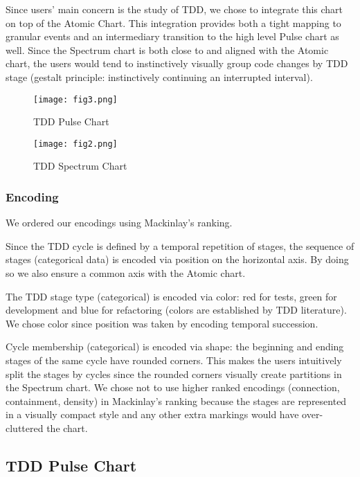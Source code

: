 \documentclass[journal]{vgtc}                %
\begin{document}
Since users' main concern is the study of TDD, we chose to integrate this chart on top of the Atomic Chart.
This integration provides both a tight mapping to granular events and an intermediary transition to the high level Pulse chart as well.
Since the Spectrum chart is both close to and aligned with the Atomic chart, the users would tend to instinctively visually group code changes by TDD stage (gestalt principle: instinctively continuing an interrupted interval).

\begin{figure*}
	\texttt{[image: fig3.png]}
	\caption{TDD Pulse Chart}
	\label{fig:three}
\end{figure*}

\begin{figure*}
	\texttt{[image: fig2.png]}
	\caption{TDD Spectrum Chart}
	\label{fig:two}
\end{figure*}

\subsubsection{Encoding}

We ordered our encodings using Mackinlay's ranking.

Since the TDD cycle is defined by a temporal repetition of stages, the sequence of stages (categorical data) is encoded via position on the horizontal axis.
By doing so we also ensure a common axis with the Atomic chart.

The TDD stage type (categorical) is encoded via color: red for tests, green for development and blue for refactoring (colors are established by TDD literature). We chose color since position was taken by encoding temporal succession.

Cycle membership (categorical) is encoded via shape: the beginning and ending stages of the same cycle have rounded corners.
This makes the users intuitively split the stages by cycles since the rounded corners visually create partitions in the Spectrum chart.
We chose not to use higher ranked encodings (connection, containment, density) in Mackinlay's ranking because the stages are represented in a visually compact style and any other extra markings would have over-cluttered the chart.

\subsection{TDD Pulse Chart}
\label{sec:pulse}
\end{document}
